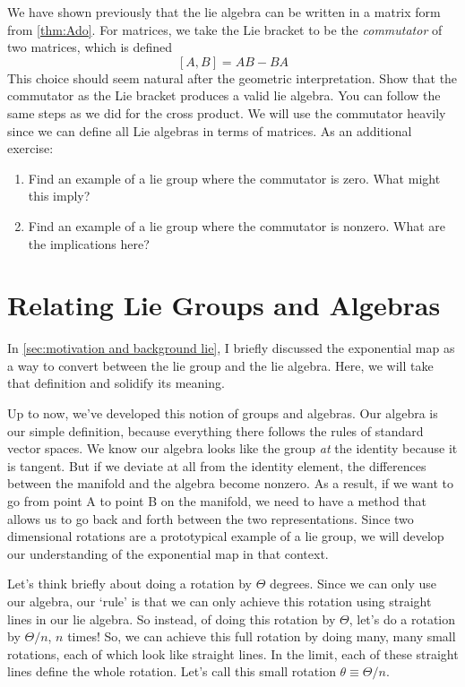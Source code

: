 \begin{exercise}
    We have shown previously that the \gls{lie algebra} can be written in a matrix form from \autoref{thm:Ado}. For matrices, we take the Lie bracket to be the \textit{commutator} of two matrices, which is defined
    $$[A,B]=AB-BA$$
    This choice should seem natural after the geometric interpretation. Show that the commutator as the Lie bracket produces a valid \gls{lie algebra}. You can follow the same steps as we did for the cross product. We will use the commutator heavily since we can define all Lie algebras in terms of matrices. As an additional exercise:
    \begin{enumerate}
        \item Find an example of a \gls{lie group} where the commutator is zero. What might this imply?
        \item Find an example of a \gls{lie group} where the commutator is nonzero. What are the implications here?
    \end{enumerate}
\end{exercise}

\section{Relating Lie Groups and Algebras}\label{sec: relating lie groups and algs}
In \autoref{sec:motivation and background lie}, I briefly discussed the \gls{exponential map} as a way to convert between the \gls{lie group} and the \gls{lie algebra}. Here, we will take that definition and solidify its meaning.

Up to now, we've developed this notion of groups and algebras. Our algebra is our simple definition, because everything there follows the rules of standard vector spaces. We know our algebra looks like the group \textit{at} the identity because it is tangent. But if we deviate at all from the identity element, the differences between the manifold and the algebra become nonzero. As a result, if we want to go from point A to point B on the manifold, we need to have a method that allows us to go back and forth between the two representations. Since two dimensional rotations are a prototypical example of a \gls{lie group}, we will develop our understanding of the exponential map in that context.

Let's think briefly about doing a rotation by $\Theta$ degrees. Since we can only use our algebra, our `rule' is that we can only achieve this rotation using straight lines in our \gls{lie algebra}. So instead, of doing this rotation by $\Theta$, let's do a rotation by $\Theta/n$, $n$ times! So, we can achieve this full rotation by doing many, many small rotations, each of which look like straight lines. In the limit, each of these straight lines define the whole rotation. Let's call this small rotation $\theta\equiv\Theta/n$.

